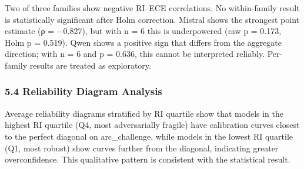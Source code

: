 Two of three families show negative RI–ECE correlations. No within-family result is statistically significant after Holm correction. Mistral shows the strongest point estimate (ρ = −0.827), but with n = 6 this is underpowered (raw p = 0.173, Holm p = 0.519). Qwen shows a positive sign that differs from the aggregate direction; with n = 6 and p = 0.636, this cannot be interpreted reliably. Per-family results are treated as exploratory.

\subsubsection{5.4 Reliability Diagram Analysis}

Average reliability diagrams stratified by RI quartile show that models in the highest RI quartile (Q4, most adversarially fragile) have calibration curves closest to the perfect diagonal on arc_challenge, while models in the lowest RI quartile (Q1, most robust) show curves further from the diagonal, indicating greater overconfidence. This qualitative pattern is consistent with the statistical result.

